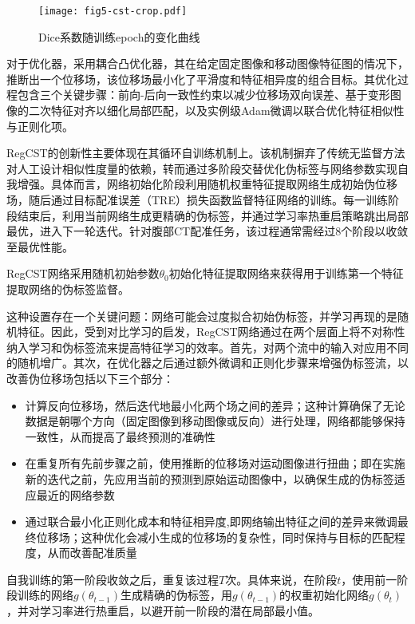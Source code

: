 \begin{figure}[h]
    \centering
    \texttt{[image: fig5-cst-crop.pdf]}
    \caption{Dice系数随训练epoch的变化曲线}
    \label{fig:regcst}
\end{figure}

对于优化器，采用耦合凸优化器\cite{siebert2022learn}，其在给定固定图像和移动图像特征图的情况下，推断出一个位移场，该位移场最小化了平滑度和特征相异度的组合目标。其优化过程包含三个关键步骤：前向-后向一致性约束以减少位移场双向误差、基于变形图像的二次特征对齐以细化局部匹配，以及实例级Adam微调以联合优化特征相似性与正则化项。

RegCST的创新性主要体现在其循环自训练机制上。该机制摒弃了传统无监督方法对人工设计相似性度量的依赖，转而通过多阶段交替优化伪标签与网络参数实现自我增强。具体而言，网络初始化阶段利用随机权重特征提取网络生成初始伪位移场，随后通过目标配准误差（TRE）损失函数监督特征网络的训练。每一训练阶段结束后，利用当前网络生成更精确的伪标签，并通过学习率热重启策略跳出局部最优，进入下一轮迭代。针对腹部CT配准任务，该过程通常需经过8个阶段以收敛至最优性能。

RegCST网络采用随机初始参数$\theta_0$初始化特征提取网络来获得用于训练第一个特征提取网络的伪标签监督。

这种设置存在一个关键问题：网络可能会过度拟合初始伪标签，并学习再现的是随机特征。因此，受到对比学习\cite{chen2021exploring}的启发，RegCST网络通过在两个层面上将不对称性纳入学习和伪标签流来提高特征学习的效率。首先，对两个流中的输入对应用不同的随机增广。其次，在优化器之后通过额外微调和正则化步骤来增强伪标签流，以改善伪位移场包括以下三个部分：

\begin{itemize}
    \item 计算反向位移场，然后迭代地最小化两个场之间的差异；这种计算确保了无论数据是朝哪个方向（固定图像到移动图像或反向）进行处理，网络都能够保持一致性，从而提高了最终预测的准确性
    \item 在重复所有先前步骤之前，使用推断的位移场对运动图像进行扭曲；即在实施新的迭代之前，先应用当前的预测到原始运动图像中，以确保生成的伪标签适应最近的网络参数
    \item 通过联合最小化正则化成本和特征相异度,即网络输出特征之间的差异来微调最终位移场；这种优化会减小生成的位移场的复杂性，同时保持与目标的匹配程度，从而改善配准质量
\end{itemize}

自我训练的第一阶段收敛之后，重复该过程$T$次。具体来说，在阶段$t$，使用前一阶段训练的网络$g(\theta_{t-1})$生成精确的伪标签，用$g(\theta_{t-1})$的权重初始化网络$g(\theta_{t})$，并对学习率进行热重启，以避开前一阶段的潜在局部最小值。

